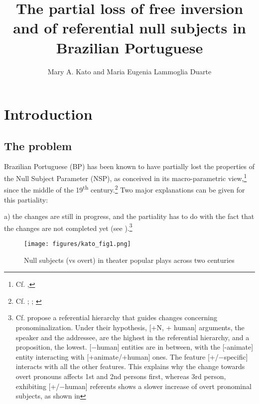 \documentclass[output=paper,colorlinks,citecolor=brown]{langscibook}
\author{Mary A. Kato\affiliation{Universidade Estadual de Campinas / UNICAMP} and Maria Eugenia Lammoglia Duarte\affiliation{Universidade Federal do Rio de Janeiro / UFRJ}}
\title[The partial loss of free inversion and of referential null subjects in BP]{The partial loss of free inversion and of referential null subjects in Brazilian Portuguese}
\begin{document}
\maketitle
\section{Introduction}
\subsection{The problem}
Brazilian Portuguese (BP) has been known to have partially lost the properties of the Null Subject Parameter (NSP), as conceived in its macro-parametric view,\footnote{Cf. \citet{rizzi_issues_1982},\citet{chomsky:1981}} since the middle of the 19\textsuperscript{th} century.\footnote{Cf. \citet{tarallo_diagnosticando_1993}; \citet{duarte1995}; \citet{kato_strong_1999, kato2000a, kato_o_2017}}
Two major explanations can be given for this partiality:

a) the changes are still in progress, and the partiality has to do with the fact that the changes are not completed yet (see ).\footnote{Cf. \citet[58--59]{cyrino2000}  propose a referential hierarchy that guides changes concerning pronominalization. Under their hypothesis, [+N, + human] arguments, the speaker and the addressee, are the highest in the referential hierarchy, and a proposition, the lowest. [$-$human] entities are in between, with the [-animate] entity interacting with [+animate/+human] ones. The feature [+/$-$specific] interacts with all the other features. This explains why the change towards overt pronouns affects 1st and 2nd persons first, whereas 3rd person, exhibiting [+/$-$human] referents shows a slower increase of overt pronominal subjects, as shown in }

\begin{figure}
    \texttt{[image: figures/kato\_fig1.png]}
    \caption{Null subjects (vs overt) in theater popular plays across two centuries \citep{duarte_pronome_1993}}
    \label{03:Fig1}
\end{figure}
\end{document}
